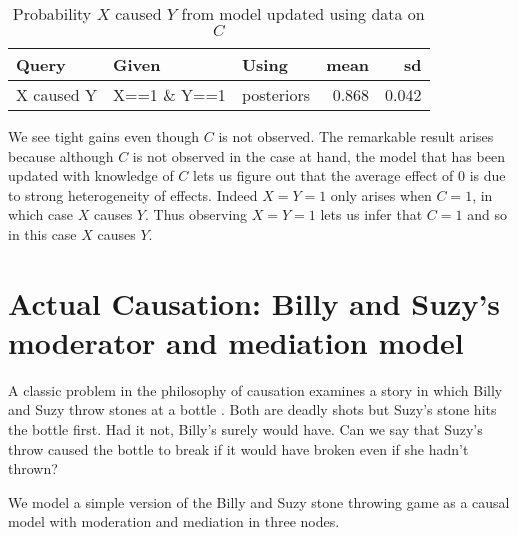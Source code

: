 \documentclass[
  12pt,
]{book}
\newenvironment{Shaded}{\begin{snugshade}}{\end{snugshade}}
\newcommand{\CommentTok}[1]{\textcolor[rgb]{0.56,0.35,0.01}{\textit{#1}}}
\newcommand{\KeywordTok}[1]{\textcolor[rgb]{0.13,0.29,0.53}{\textbf{#1}}}
\newcommand{\NormalTok}[1]{#1}
\newcommand{\OperatorTok}[1]{\textcolor[rgb]{0.81,0.36,0.00}{\textbf{#1}}}
\newcommand{\StringTok}[1]{\textcolor[rgb]{0.31,0.60,0.02}{#1}}
\begin{document}
\begin{table}

\caption{\label{tab:unnamed-chunk-81}Probability $X$ caused $Y$ from model updated using data on $C$}
\centering
\begin{tabular}[t]{l|l|l|r|r}
\hline
Query & Given & Using & mean & sd\\
\hline
X caused Y & X==1 \& Y==1 & posteriors & 0.868 & 0.042\\
\hline
\end{tabular}
\end{table}

We see tight gains even though \(C\) is not observed. The remarkable result arises because although \(C\) is not observed in the case at hand, the model that has been updated with knowledge of \(C\) lets us figure out that the average effect of 0 is due to strong heterogeneity of effects. Indeed \(X=Y=1\) only arises when \(C=1\), in which case \(X\) causes \(Y\). Thus observing \(X=Y=1\) lets us infer that \(C=1\) and so in this case \(X\) causes \(Y\).

\hypertarget{Billy}{%
\section{Actual Causation: Billy and Suzy's moderator and mediation model}\label{Billy}}

A classic problem in the philosophy of causation examines a story in which Billy and Suzy throw stones at a bottle \citep{hall2004two}. Both are deadly shots but Suzy's stone hits the bottle first. Had it not, Billy's surely would have. Can we say that Suzy's throw caused the bottle to break if it would have broken even if she hadn't thrown?

We model a simple version of the Billy and Suzy stone throwing game as a causal model with moderation and mediation in three nodes.

\begin{Shaded}
\end{Shaded}
\end{document}
